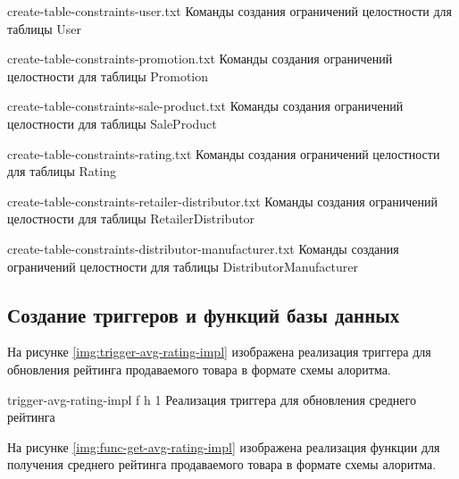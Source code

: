 {create-table-constraints-user.txt} %
{Команды создания ограничений целостности для таблицы User} %

{create-table-constraints-promotion.txt} %
{Команды создания ограничений целостности для таблицы Promotion} %

\clearpage

{create-table-constraints-sale-product.txt} %
{Команды создания ограничений целостности для таблицы SaleProduct} %

{create-table-constraints-rating.txt} %
{Команды создания ограничений целостности для таблицы Rating} %

\clearpage

{create-table-constraints-retailer-distributor.txt} %
{Команды создания ограничений целостности для таблицы RetailerDistributor} %

{create-table-constraints-distributor-manufacturer.txt} %
{Команды создания ограничений целостности для таблицы DistributorManufacturer} %

\clearpage

\subsection{Создание триггеров и функций базы данных}

На рисунке \ref{img:trigger-avg-rating-impl} изображена реализация триггера для обновления рейтинга продаваемого товара в формате схемы алоритма.

{trigger-avg-rating-impl} %
{f} %
{h} %
{1\textwidth} %
{Реализация триггера для обновления среднего рейтинга} %

\clearpage

На рисунке \ref{img:func-get-avg-rating-impl} изображена реализация функции для получения среднего рейтинга продаваемого товара в формате схемы алоритма.

